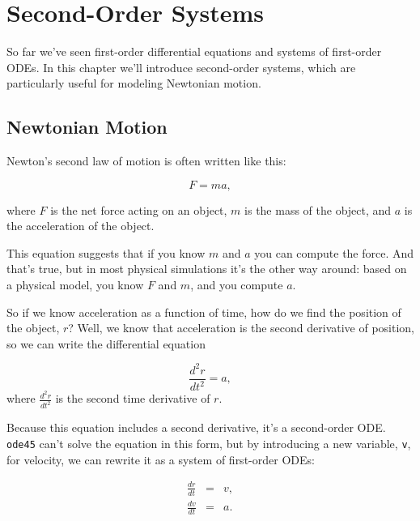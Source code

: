 \chapter{Second-Order Systems}

So far we've seen first-order differential equations and systems of first-order ODEs.  In this chapter we'll introduce second-order systems, which are particularly useful for modeling Newtonian motion.


\section{Newtonian Motion}

Newton's second law of motion is often written like this:

\begin{equation*}
    F = m a,
\end{equation*}

where $F$ is the net force acting on an object, $m$ is the
mass of the object, and $a$ is the acceleration of the object.

This equation suggests
that if you know $m$ and $a$ you can compute the force.  And that's true,
but in most physical simulations it's the other way around: based on a
physical model, you know $F$ and $m$, and you compute $a$.


So if we know acceleration as a function of time, how do we
find the position of the object, $r$?  Well, we know that acceleration
is the second derivative of position, so we can write the differential
equation

\begin{equation*}
    \frac{d^2r}{dt^2} = a,
\end{equation*}
where $\frac{d^2r}{dt^2}$ is the second time derivative of $r$.

Because this equation includes a second derivative, it's
a second-order ODE.  \lstinline{ode45} can't solve the equation in this form, but
by introducing a new variable, \lstinline{v}, for velocity, we can rewrite it
as a system of first-order ODEs:

\begin{eqnarray*}
    \frac{dr}{dt} &=& v,   \\
    \frac{dv}{dt} &=& a.
\end{eqnarray*}


